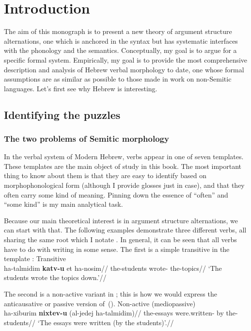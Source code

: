 \chapter{Introduction}
\label{chap:intro}

The aim of this monograph is to present a new theory of argument structure alternations, one which is anchored in the syntax but has systematic interfaces with the phonology and the semantics. Conceptually, my goal is to argue for a specific formal system. Empirically, my goal is to provide the most comprehensive description and analysis of Hebrew verbal morphology to date, one whose formal assumptions are as similar as possible to those made in work on non-Semitic languages. Let's first see why Hebrew is interesting.

\section{Identifying the puzzles}
	\subsection{The two problems of Semitic morphology}
In the verbal system of Modern Hebrew, verbs appear in one of seven templates. These templates are the main object of study in this book. The most important thing to know about them is that they are easy to identify based on morphophonological form (although I provide glosses just in case), and that they often carry some kind of meaning. Pinning down the essence of ``often'' and ``some kind'' is my main analytical task.

Because our main theoretical interest is in argument structure alternations, we can start with that. The following examples demonstrate three different verbs, all sharing the same root which I notate . In general, it can be seen that all verbs have to do with writing in some sense. The first is a simple transitive in the template {\tkal}:
\ex	\label{ex:intro-tkal}Transitive {\tkal}\\
		\begingl
		\gla ha-talmidim \textbf{katv-u} et ha-nosim//
		\glb the-students wrote-  the-topics//
		\glft `The students wrote the topics down.'//
	\endgl
\xe

The second is a non-active variant in {\tnif}; this is how we would express the anticausative or passive version of~(\lastx).
\ex \label{ex:intro-tnif}Non-active (mediopassive) {\tnif}\\
		\begingl
		\gla ha-xiburim \textbf{nixtev-u} (al-jedej ha-talmidim)//
		\glb the-essays were.written- by the-students//
		\glft `The essays were written (by the students)'.//
	\endgl
\xe

